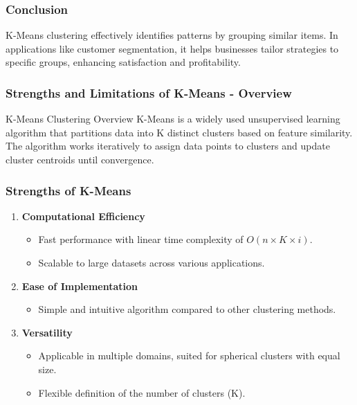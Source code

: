 \documentclass[aspectratio=169]{beamer}
\begin{document}
\begin{frame}[fragile]
    \frametitle{Conclusion}
    K-Means clustering effectively identifies patterns by grouping similar items. In applications like customer segmentation, it helps businesses tailor strategies to specific groups, enhancing satisfaction and profitability.
\end{frame}

\begin{frame}[fragile]
    \frametitle{Strengths and Limitations of K-Means - Overview}
    \begin{block}{K-Means Clustering Overview}
        K-Means is a widely used unsupervised learning algorithm that partitions data into K distinct clusters based on feature similarity. 
        The algorithm works iteratively to assign data points to clusters and update cluster centroids until convergence.
    \end{block}
\end{frame}

\begin{frame}[fragile]
    \frametitle{Strengths of K-Means}
    \begin{enumerate}
        \item \textbf{Computational Efficiency}
        \begin{itemize}
            \item Fast performance with linear time complexity of \(O(n \times K \times i)\).
            \item Scalable to large datasets across various applications.
        \end{itemize}
        
        \item \textbf{Ease of Implementation}
        \begin{itemize}
            \item Simple and intuitive algorithm compared to other clustering methods.
        \end{itemize}
        
        \item \textbf{Versatility}
        \begin{itemize}
            \item Applicable in multiple domains, suited for spherical clusters with equal size.
            \item Flexible definition of the number of clusters (K).
        \end{itemize}
    \end{enumerate}
\end{frame}
\end{document}
